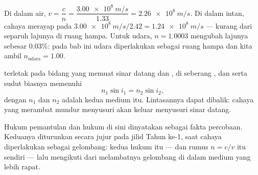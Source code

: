 \begin{example}\label{ex:g10:refraction:speed}
Di dalam air, $v = \dfrac{c}{n} = \dfrac{\qty{3.00e8}{m/s}}{1.33}
= \qty{2.26e8}{m/s}$. Di dalam intan, cahaya merayap pada
$\qty{3.00e8}{m/s}/2.42 = \qty{1.24e8}{m/s}$ --- kurang dari separuh
lajunya di ruang hampa. Untuk udara, $n = 1.0003$ mengubah lajunya
sebesar $0.03\%$: pada bab ini udara diperlakukan sebagai ruang hampa
dan kita ambil $n_{\text{udara}} = 1.00$.
\end{example}

\begin{theorem}\label{thm:g10:refraction:snell}
 terletak pada bidang yang memuat sinar datang dan , di seberang , dan  serta sudut biasnya
memenuhi
\[
n_1 \sin i_1 = n_2 \sin i_2 ,
\]
dengan $n_1$ dan $n_2$ adalah  kedua medium itu. Lintasannya
dapat dibalik: cahaya yang merambat mundur menyusuri  akan
keluar menyusuri sinar datang.
\end{theorem}
\admitted

\begin{remark}\label{rem:g10:refraction:honest}
Hukum pemantulan dan hukum  di sini dinyatakan sebagai fakta
percobaan. Keduanya diturunkan secara jujur pada jilid Tahun ke-1, saat
cahaya diperlakukan sebagai gelombang: kedua hukum itu --- dan rumus
$n = c/v$ itu sendiri --- lalu mengikuti dari melambatnya gelombang di
dalam medium yang lebih rapat.
\end{remark}

